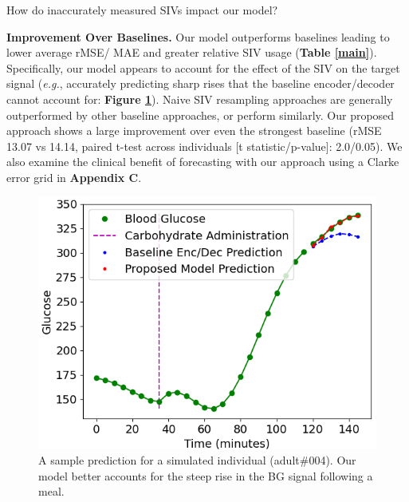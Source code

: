 \documentclass[letterpaper]{article}
\begin{document}
     How do inaccurately measured SIVs impact our model? 



\textbf{Improvement Over Baselines.} Our model outperforms baselines leading to lower average rMSE/ MAE and greater relative SIV usage (\textbf{Table \ref{main}}). Specifically, our model appears to account for the effect of the SIV on the target signal (\textit{e.g.}, accurately predicting sharp rises that the baseline encoder/decoder cannot account for: \textbf{Figure \ref{fig:sampplot}}). Naive SIV resampling approaches are generally outperformed by other baseline approaches, or perform similarly. Our proposed approach shows a large improvement over even the strongest baseline (rMSE 13.07 vs 14.14, paired t-test across individuals [t statistic/p-value]: 2.0/0.05).  We also examine the clinical benefit of forecasting with our approach using a Clarke error grid in \textbf{Appendix C}.

\begin{figure}[t]
  \centering 
\hspace*{-.3cm}  \includegraphics[height=1.7 in]{91.png}
\caption{A sample prediction for a simulated individual (adult\#004). Our model better accounts for the steep rise in the BG signal following a meal.}\label{fig:sampplot}
\end{figure}
\end{document}

